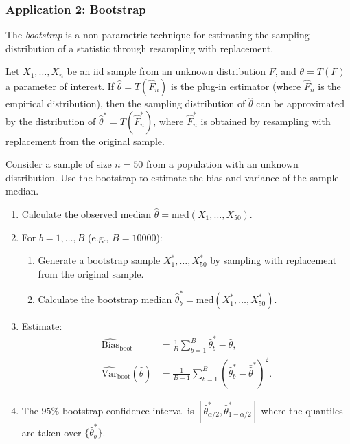 

\subsubsection{Application 2: Bootstrap}

The \emph{bootstrap} is a non-parametric technique for estimating the sampling distribution of a statistic through resampling with replacement.

\begin{teorema}
Let $X_1, \ldots, X_n$ be an iid sample from an unknown distribution $F$, and $\theta = T(F)$ a parameter of interest. If $\hat{\theta} = T(\hat{F}_n)$ is the plug-in estimator (where $\hat{F}_n$ is the empirical distribution), then the sampling distribution of $\hat{\theta}$ can be approximated by the distribution of $\hat{\theta}^* = T(\hat{F}_n^*)$, where $\hat{F}_n^*$ is obtained by resampling with replacement from the original sample.
\end{teorema}

\begin{ejemplo}
 \label{exmp:3.2.8}
Consider a sample of size $n = 50$ from a population with an unknown distribution. Use the bootstrap to estimate the bias and variance of the sample median.
\end{ejemplo}

\begin{solucion}
\begin{enumerate}
 \item Calculate the observed median $\hat{\theta} = \text{med}(X_1, \ldots, X_{50})$.
 \item For $b = 1, \ldots, B$ (e.g., $B = 10000$):
   \begin{enumerate}
    \item Generate a bootstrap sample $X_1^*, \ldots, X_{50}^*$ by sampling with replacement from the original sample.
    \item Calculate the bootstrap median $\hat{\theta}_b^* = \text{med}(X_1^*, \ldots, X_{50}^*)$.
   \end{enumerate}
 \item Estimate:
   \begin{align}
    \widehat{\text{Bias}}_{\text{boot}} &= \frac{1}{B}\sum_{b=1}^B \hat{\theta}_b^* - \hat{\theta}, \\
    \widehat{\text{Var}}_{\text{boot}}(\hat{\theta}) &= \frac{1}{B-1}\sum_{b=1}^B (\hat{\theta}_b^* - \bar{\hat{\theta}}^*)^2.
   \end{align}
 \item The $95\%$ bootstrap confidence interval is $[\hat{\theta}_{\alpha/2}^*, \hat{\theta}_{1-\alpha/2}^*]$ where the quantiles are taken over $\{\hat{\theta}_b^*\}$.
\end{enumerate}
\end{solucion}


